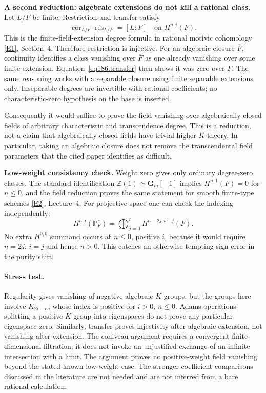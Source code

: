 \documentclass[11pt,a4paper]{article}
\newcommand{\Z}{\mathbb{Z}}
\newcommand{\PP}{\mathbb P}
\newcommand{\eref}[2]{\hyperlink{extra:#1:#2}{[E#2]}}
\numberwithin{equation}{section}
\begin{document}
\textbf{A second reduction: algebraic extensions do not kill a rational class.} Let $L/F$ be finite. Restriction and transfer satisfy
\begin{equation}\label{eq186:transfer}
 \operatorname{cor}_{L/F}\operatorname{res}_{L/F}=[L:F]
 \quad\text{on }H^{n,i}(F).
\end{equation}
This is the finite-field-extension degree formula in rational motivic cohomology \eref{30006779}{1}, Section~4. Therefore restriction is injective. For an algebraic closure $\overline F$, continuity identifies a class vanishing over $\overline F$ as one already vanishing over some finite extension. Equation~\eqref{eq186:transfer} then shows it was zero over $F$. The same reasoning works with a separable closure using finite separable extensions only. Inseparable degrees are invertible with rational coefficients; no characteristic-zero hypothesis on the base is inserted.

Consequently it would suffice to prove the field vanishing over algebraically closed fields of arbitrary characteristic and transcendence degree. This is a reduction, not a claim that algebraically closed fields have trivial higher $K$-theory. In particular, taking an algebraic closure does not remove the transcendental field parameters that the cited paper identifies as difficult.

\textbf{Low-weight consistency check.} Weight zero gives only ordinary degree-zero classes. The standard identification $\Z(1)\simeq\mathbf G_m[-1]$ implies $H^{n,1}(F)=0$ for $n\le0$, and the field reduction proves the same statement for smooth finite-type schemes \eref{30006779}{2}, Lecture~4. For projective space one can check the indexing independently:
\[
 H^{n,i}(\PP^r_F)=\bigoplus_{j=0}^{r}H^{n-2j,i-j}(F).
\]
No extra $H^{0,0}$ summand occurs at $n\le0$, positive $i$, because it would require $n=2j$, $i=j$ and hence $n>0$. This catches an otherwise tempting sign error in the purity shift.

\paragraph{Stress test.}
Regularity gives vanishing of negative algebraic $K$-groups, but the groups here involve $K_{2i-n}$, whose index is positive for $i>0$, $n\le0$. Adams operations splitting a positive $K$-group into eigenspaces do not prove any particular eigenspace zero. Similarly, transfer proves injectivity after algebraic extension, not vanishing after extension. The coniveau argument requires a convergent finite-dimensional filtration; it does not invoke an unjustified exchange of an infinite intersection with a limit. The argument proves no positive-weight field vanishing beyond the stated known low-weight case. The stronger coefficient comparisons discussed in the literature are not needed and are not inferred from a bare rational calculation.
\end{document}
